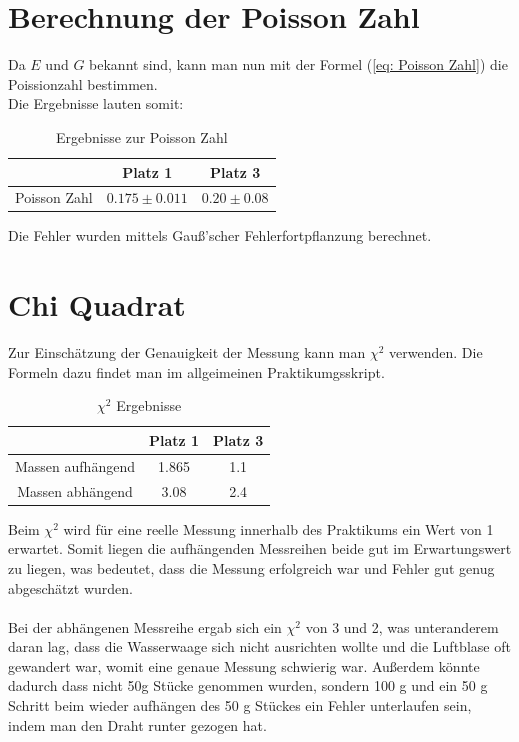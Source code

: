 \documentclass[bibliography=totocnumbered]{scrartcl}
\begin{document}
	

	
	
	
	
	
	
	
	
	
	\section{Berechnung der Poisson Zahl}
	
	Da $ E $ und $ G $ bekannt sind, kann man nun mit der Formel (\ref{eq: Poisson Zahl}) die Poissionzahl bestimmen.\\
	Die Ergebnisse lauten somit:
	
	\begin{table}[ht!]
		\centering
		\caption{Ergebnisse zur Poisson Zahl}
		\begin{tabular}{|c|c|c|}
			\hline
			& Platz 1 & Platz 3 \\
			\hline
			Poisson Zahl &$ 0.175\pm 0.011 $ &      $ 0.20\pm0.08 $  \\
			\hline
		\end{tabular}
		\label{tab: ergebnisse Poisson zahl}
	\end{table}
	Die Fehler wurden mittels Gauß'scher Fehlerfortpflanzung berechnet.
	
	\section{Chi Quadrat}\label{sect: chi quadrat}
	Zur Einschätzung der Genauigkeit der Messung kann man $ \chi^{2} $ verwenden. Die Formeln dazu findet man im allgeimeinen Praktikumgsskript\smartcite{MullerPG.2007b}.
	\begin{table}[ht!]
		\centering
		\caption{$ \chi^{2} $ Ergebnisse}
		\begin{tabular}{|c|c|c|}
			\hline
			& Platz 1 & Platz 3 \\
			\hline
			Massen aufhängend & 1.865 & 1.1 \\
			\hline
			Massen abhängend & 3.08 & 2.4 \\
			\hline
		\end{tabular}
		\label{tab: chi quadrat}
	\end{table}
	Beim $ \chi^{2} $ wird für eine reelle Messung innerhalb des Praktikums ein Wert von 1 erwartet.
	Somit liegen die aufhängenden Messreihen beide gut im Erwartungswert zu liegen, was bedeutet, dass die Messung erfolgreich war und Fehler gut genug abgeschätzt wurden.\\\\
	Bei der abhängenen Messreihe ergab sich ein $ \chi^{2} $ von 3 und 2, was unteranderem daran lag, dass die Wasserwaage sich nicht ausrichten wollte und die Luftblase oft gewandert war, womit eine genaue Messung schwierig war. Außerdem könnte dadurch dass nicht 50g Stücke genommen wurden, sondern 100 g und ein 50 g Schritt beim wieder aufhängen des 50 g Stückes ein Fehler unterlaufen sein, indem man den Draht runter gezogen hat.
	
\end{document}
